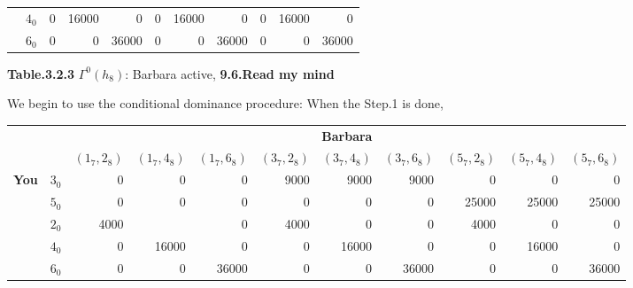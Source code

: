 \documentclass{article}
\begin{document}
\begin{description}
\begin{center}
\begin{tabular}{rrrrrrrrrrr}
        \multicolumn{ 1}{c}{{\bf }} &        $4_0$ &          0 &      16000 &          0 &          0 &      16000 &          0 &          0 &      16000 &          0 \\

        \multicolumn{ 1}{c}{{\bf }} &        $6_0$ &          0 &          0 &      36000 &          0 &          0 &      36000 &          0 &          0 &      36000 \\
        \hline
        \hline
        \end{tabular}

         {\bf Table.3.2.3 }$\Gamma ^0(h_8)$: Barbara active, {\bf 9.6.Read my mind}
    \end{center}
    We begin to use the conditional dominance procedure:
    \newpage
    When the Step.1 is done,
    \begin{center}
        \begin{tabular}{rrrrrrrrrrr}
        \hline
        \hline
                   &            &                                                                                 \multicolumn{ 9}{c}{{\bf Barbara}} \\

                   &            &  $(1_7,2_8)$ &  $(1_7,4_8)$ &  $(1_7,6_8)$ &  $(3_7,2_8)$ &  $(3_7,4_8)$ &  $(3_7,6_8)$ &  $(5_7,2_8)$ &  $(5_7,4_8)$ &  $(5_7,6_8)$ \\
        \hline
        \multicolumn{ 1}{c}{{\bf You}} &        $3_0$ &          0 &          0 &          0 &       9000 &       9000 &       9000 &          0 &          0 &          0 \\

        \multicolumn{ 1}{c}{{\bf }} &        $5_0$ &          0 &          0 &          0 &          0 &          0 &          0 &      25000 &      25000 &      25000 \\

        \multicolumn{ 1}{c}{{\bf }} &        $2_0$ &       4000 &            &          0 &       4000 &          0 &          0 &       4000 &          0 &          0 \\

        \multicolumn{ 1}{c}{{\bf }} &        $4_0$ &          0 &      16000 &          0 &          0 &      16000 &          0 &          0 &      16000 &          0 \\

        \multicolumn{ 1}{c}{{\bf }} &        $6_0$ &          0 &          0 &      36000 &          0 &          0 &      36000 &          0 &          0 &      36000 \\
        \hline
        \hline
        \end{tabular}


\end{center}
\end{description}
\end{document}
